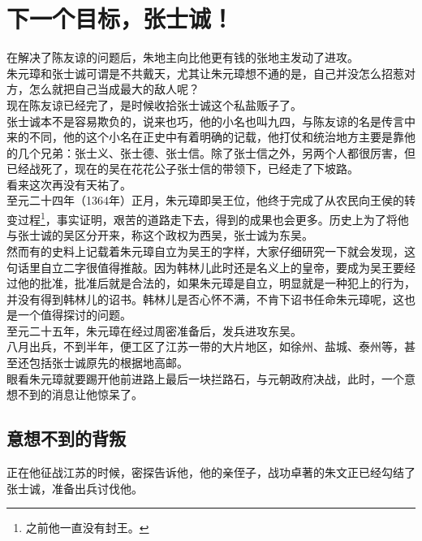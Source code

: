 \section{下一个目标，张士诚！}
\ifnum{}
	\begin{multicols}{\theparacolNo}
\fi
在解决了陈友谅的问题后，朱地主向比他更有钱的张地主发动了进攻。\\

朱元璋和张士诚可谓是不共戴天，尤其让朱元璋想不通的是，自己并没怎么招惹对方，怎么就把自己当成最大的敌人呢？\\

现在陈友谅已经完了，是时候收拾张士诚这个私盐贩子了。\\

张士诚本不是容易欺负的，说来也巧，他的小名也叫九四，与陈友谅的名是传言中来的不同，他的这个小名在正史中有着明确的记载，他打仗和统治地方主要是靠他的几个兄弟：张士义、张士德、张士信。除了张士信之外，另两个人都很厉害，但已经战死了，现在的吴在花花公子张士信的带领下，已经走了下坡路。\\

看来这次再没有天祐了。\\

至元二十四年（1364年）正月，朱元璋即吴王位，他终于完成了从农民向王侯的转变过程\footnote{之前他一直没有封王。}，事实证明，艰苦的道路走下去，得到的成果也会更多。历史上为了将他与张士诚的吴区分开来，称这个政权为西吴，张士诚为东吴。\\

然而有的史料上记载着朱元璋自立为吴王的字样，大家仔细研究一下就会发现，这句话里自立二字很值得推敲。因为韩林儿此时还是名义上的皇帝，要成为吴王要经过他的批准，批准后就是合法的，如果朱元璋是自立，明显就是一种犯上的行为，并没有得到韩林儿的诏书。韩林儿是否心怀不满，不肯下诏书任命朱元璋呢，这也是一个值得探讨的问题。\\

至元二十五年，朱元璋在经过周密准备后，发兵进攻东吴。\\

八月出兵，不到半年，便工区了江苏一带的大片地区，如徐州、盐城、泰州等，甚至还包括张士诚原先的根据地高邮。\\

眼看朱元璋就要踢开他前进路上最后一块拦路石，与元朝政府决战，此时，一个意想不到的消息让他惊呆了。\\

\subsection{意想不到的背叛}
正在他征战江苏的时候，密探告诉他，他的亲侄子，战功卓著的朱文正已经勾结了张士诚，准备出兵讨伐他。\\


\end{multicols}
